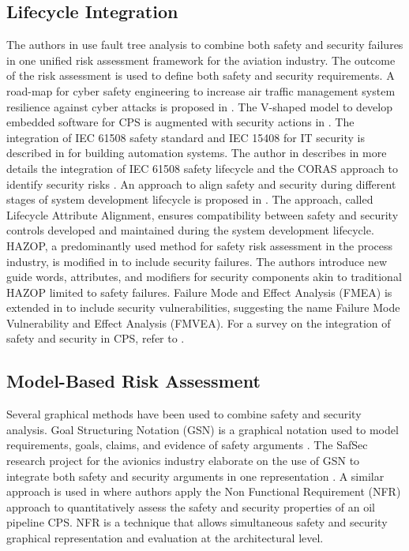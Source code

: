 \documentclass[journal]{IEEEtran}
\begin{document}
\subsection{Lifecycle Integration}
The authors in \cite{Kornecki2013b} use fault tree analysis to combine both safety and security failures in one unified risk assessment framework for the aviation industry. The outcome of the risk assessment is used to define both safety and security requirements. A road-map for cyber safety engineering to increase air traffic management system resilience against cyber attacks is proposed in \cite{Johnson2012}. The V-shaped model to develop embedded software for CPS is augmented with security actions in \cite{Kornecki2010}. The integration of IEC 61508 safety standard and IEC 15408 for IT security is described in \cite{Novak2007a,Novak2008a,Novak2010a} for building automation systems. The author in \cite{Sorby2003} describes in more details the integration of IEC 61508 safety lifecycle and the CORAS approach to identify security risks \cite{Stolen2003}. An approach to align safety and security during different stages of system development lifecycle is proposed in \cite{Hunter2009}. The approach, called Lifecycle Attribute Alignment, ensures compatibility between safety and security controls developed and maintained during the system development lifecycle. HAZOP, a predominantly used method for safety risk assessment in the process industry, is modified in \cite{Winther2001} to include security failures. The authors introduce new guide words, attributes, and modifiers for security components akin to traditional HAZOP limited to safety failures. Failure Mode and Effect Analysis (FMEA) is extended in \cite{Schmittner2014} to include security vulnerabilities, suggesting the name Failure Mode Vulnerability and Effect Analysis (FMVEA). For a survey on the integration of safety and security in CPS, refer to \cite{Lyu2019SafetySystems}.

\subsection{Model-Based Risk Assessment}
Several graphical methods have been used to combine safety and security analysis. Goal Structuring Notation (GSN) is a graphical notation used to model requirements, goals, claims, and evidence of safety arguments \cite{Attwood2011}. The SafSec research project for the avionics industry elaborate on the use of GSN to integrate both safety and security arguments in one representation \cite{Lautieri2007}. A similar approach is used in \cite{Subramanian2016} where authors apply the Non Functional Requirement (NFR) approach to quantitatively assess the safety and security properties of an oil pipeline CPS. NFR is a technique that allows simultaneous safety and security graphical representation and evaluation at the architectural level.
\end{document}
